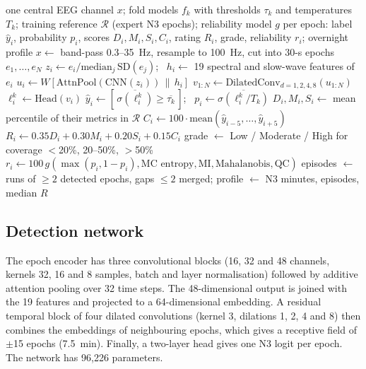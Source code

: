 \begin{algorithm}[!t]
\caption{Detection and description of one recording}
\label{alg:pipeline}
\footnotesize
\begin{algorithmic}[1]
\Require one central EEG channel $x$; fold models $f_k$ with thresholds $\tau_k$ and temperatures $T_k$; training reference $\mathcal{R}$ (expert N3 epochs); reliability model $g$
\Ensure per epoch: label $\hat{y}_i$, probability $p_i$, scores $D_i, M_i, S_i, C_i$, rating $R_i$, grade, reliability $r_i$; overnight profile
\State $x \gets$ band-pass 0.3--35~Hz, resample to 100~Hz, cut into 30-s epochs $e_1,\dots,e_N$
\State $z_i \gets e_i / \mathrm{median}_j\,\mathrm{SD}(e_j)$; \ $h_i \gets$ 19 spectral and slow-wave features of $e_i$
  \State $u_i \gets W[\mathrm{AttnPool}(\mathrm{CNN}(z_i)) \,\|\, h_i]$ 
  \State $v_{1:N} \gets \mathrm{DilatedConv}_{d=1,2,4,8}(u_{1:N})$ 
  \State $\ell^k_i \gets \mathrm{Head}(v_i)$
\EndFor
\State $\hat{y}_i \gets [\,\overline{\sigma(\ell^k_i)} \ge \overline{\tau_k}\,]$; \ $p_i \gets \overline{\sigma(\ell^k_i/T_k)}$ 
  \State $D_i, M_i, S_i \gets$ mean percentile of their metrics in $\mathcal{R}$
  \State $C_i \gets 100 \cdot \mathrm{mean}(\hat{y}_{i-5},\dots,\hat{y}_{i+5})$
  \State $R_i \gets 0.35D_i + 0.30M_i + 0.20S_i + 0.15C_i$
  \State grade $\gets$ Low / Moderate / High for coverage $<$20\%, 20--50\%, $>$50\%
\EndFor
\State $r_i \gets 100\,g(\max(p_i,1-p_i), \text{MC entropy}, \text{MI}, \text{Mahalanobis}, \text{QC})$
\State episodes $\gets$ runs of $\ge 2$ detected epochs, gaps $\le 2$ merged; profile $\gets$ N3 minutes, episodes, median $R$
\end{algorithmic}
\end{algorithm}

\subsection{Detection network}
The epoch encoder has three convolutional blocks (16, 32 and 48 channels, kernels 32, 16 and 8 samples, batch and layer normalisation) followed by additive attention pooling over 32 time steps. The 48-dimensional output is joined with the 19 features and projected to a 64-dimensional embedding. A residual temporal block of four dilated convolutions (kernel 3, dilations 1, 2, 4 and 8) then combines the embeddings of neighbouring epochs, which gives a receptive field of $\pm$15 epochs (7.5~min). Finally, a two-layer head gives one N3 logit per epoch. The network has 96,226 parameters. %

